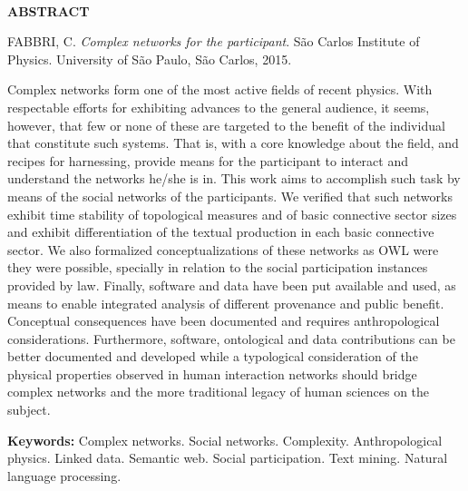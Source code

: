 \documentclass[a4paper,openright,12pt]{report} %
\begin{document}

\newpage\ \thispagestyle{empty}  \newpage\thispagestyle{empty}


\begin{singlespace}

\centerline{\LARGE{{\bf ABSTRACT}}}

\vspace*{1.5cm}

\hspace*{-0.9cm} FABBRI, C. \textit{Complex networks for the participant}. 
São Carlos Institute of Physics. University of São Paulo, São Carlos, 2015. 

\vspace*{1.2cm}

\hspace*{-0.9cm}

{\noindent
	Complex networks form one of the most active fields of recent physics.
	With respectable efforts for exhibiting advances to the general audience, 
	it seems, however, that few or none of these are targeted to the benefit of the individual that constitute such systems.
	That is, with a core knowledge about the field, and recipes for harnessing,
	provide means for the participant to interact and understand the networks he/she is in.
	This work aims to accomplish such task by means of the social networks of the participants.
	We verified that such networks exhibit time stability of topological measures and
	of basic connective sector sizes and exhibit differentiation of the textual production in each basic connective sector.
	We also formalized conceptualizations of these networks as OWL were they were possible, specially
	in relation to the social participation instances provided by law. Finally, software and
	data have been put available and used, as means to enable integrated analysis of different provenance and public benefit.
	Conceptual consequences have been documented and requires anthropological considerations.
	Furthermore, software, ontological and data contributions can be better documented and developed while
	a typological consideration of the physical properties observed in human interaction networks should
	bridge complex networks and the more traditional legacy of human sciences on the subject.
}

\vspace*{1.5cm}
\hspace*{-0.9cm} {\bf Keywords:} Complex networks. Social networks. Complexity. Anthropological physics. Linked data. Semantic web. Social participation. Text mining. Natural language processing.

\end{singlespace}
\end{document}

